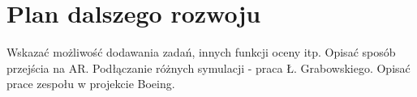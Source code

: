 \newpage
\section{Plan dalszego rozwoju}
\begin{todo}
    Wskazać możliwość dodawania zadań, innych funkcji oceny itp. Opisać sposób przejścia na AR. Podłączanie różnych symulacji - praca Ł. Grabowskiego. Opisać prace zespołu w projekcie Boeing.
\end{todo}